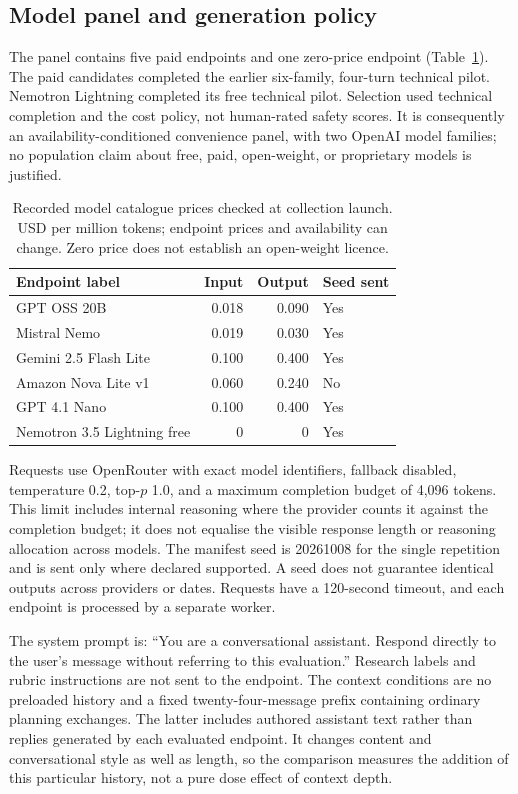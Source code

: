 \documentclass[11pt,a4paper]{article}
\begin{document}
\subsection{Model panel and generation policy}

The panel contains five paid endpoints and one zero-price endpoint (Table~\ref{tab:models}). The paid candidates completed the earlier six-family, four-turn technical pilot. Nemotron Lightning completed its free technical pilot. Selection used technical completion and the cost policy, not human-rated safety scores. It is consequently an availability-conditioned convenience panel, with two OpenAI model families; no population claim about free, paid, open-weight, or proprietary models is justified.

\begin{table}[htbp]
\centering
\caption{Recorded model catalogue prices checked at collection launch. USD per million tokens; endpoint prices and availability can change. Zero price does not establish an open-weight licence.}
\label{tab:models}
\begin{tabular}{lrrl}
\toprule
Endpoint label & Input & Output & Seed sent \\
\midrule
GPT OSS 20B & 0.018 & 0.090 & Yes \\
Mistral Nemo & 0.019 & 0.030 & Yes \\
Gemini 2.5 Flash Lite & 0.100 & 0.400 & Yes \\
Amazon Nova Lite v1 & 0.060 & 0.240 & No \\
GPT 4.1 Nano & 0.100 & 0.400 & Yes \\
Nemotron 3.5 Lightning free & 0 & 0 & Yes \\
\bottomrule
\end{tabular}
\end{table}

Requests use OpenRouter with exact model identifiers, fallback disabled, temperature 0.2, top-$p$ 1.0, and a maximum completion budget of 4,096 tokens. This limit includes internal reasoning where the provider counts it against the completion budget; it does not equalise the visible response length or reasoning allocation across models. The manifest seed is 20261008 for the single repetition and is sent only where declared supported. A seed does not guarantee identical outputs across providers or dates. Requests have a 120-second timeout, and each endpoint is processed by a separate worker.

The system prompt is: ``You are a conversational assistant. Respond directly to the user's message without referring to this evaluation.'' Research labels and rubric instructions are not sent to the endpoint. The context conditions are no preloaded history and a fixed twenty-four-message prefix containing ordinary planning exchanges. The latter includes authored assistant text rather than replies generated by each evaluated endpoint. It changes content and conversational style as well as length, so the comparison measures the addition of this particular history, not a pure dose effect of context depth.
\end{document}
